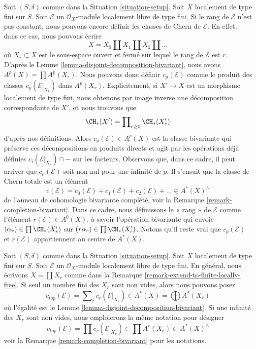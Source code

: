 \begin{remark}
\label{remark-extend-to-finite-locally-free}
Soit $(S, \delta)$ comme dans la Situation \ref{situation-setup}.
Soit $X$ localement de type fini sur $S$.
Soit $\mathcal{E}$ un $\mathcal{O}_X$-module localement libre de type fini.
Si le rang de $\mathcal{E}$ n'est pas constant, nous pouvons
encore définir les classes de Chern de $\mathcal{E}$. En effet, dans ce
cas, nous pouvons écrire
$$
X = X_0 \amalg X_1 \amalg X_2 \amalg \ldots
$$
où $X_r \subset X$ est le sous-espace ouvert et fermé sur lequel
le rang de $\mathcal{E}$ est $r$. D'après le
Lemme \ref{lemma-disjoint-decomposition-bivariant},
nous avons $A^p(X) = \prod A^p(X_r)$.
Nous pouvons donc définir $c_p(\mathcal{E})$ comme le
produit des classes $c_p(\mathcal{E}|_{X_r})$ dans $A^p(X_r)$.
Explicitement, si $X' \to X$ est un morphisme localement de type fini,
nous obtenons par image inverse une décomposition correspondante de $X'$,
et nous trouvons que
$$
\CH_*(X') = \prod\nolimits_{r \geq 0} \CH_*(X'_r)
$$
d'après nos définitions. Alors $c_p(\mathcal{E}) \in A^p(X)$
est la classe bivariante qui préserve ces décompositions
en produits directs et agit par les opérations déjà définies
$c_i(\mathcal{E}|_{X_r}) \cap -$
sur les facteurs. Observons que, dans ce cadre, il peut arriver
que $c_p(\mathcal{E})$ soit non nul pour une infinité de $p$.
Il s'ensuit que la classe de Chern totale est un élément
$$
c(\mathcal{E}) =
c_0(\mathcal{E}) + c_1(\mathcal{E}) + c_2(\mathcal{E}) + \ldots
\in A^*(X)^\wedge
$$
de l'anneau de cohomologie bivariante complété, voir la
Remarque \ref{remark-completion-bivariant}.
Dans ce cadre, nous définissons le « rang » de $\mathcal{E}$
comme l'élément $r(\mathcal{E}) \in A^0(X)$,
à savoir l'opération bivariante qui envoie $(\alpha_r) \in \prod \CH_*(X'_r)$
sur $(r\alpha_r) \in \prod \CH_*(X'_r)$.
Notons qu'il reste vrai que $c_p(\mathcal{E})$ et $r(\mathcal{E})$
appartiennent au centre de $A^*(X)$.
\end{remark}

\begin{remark}
\label{remark-top-chern-class}
Soit $(S, \delta)$ comme dans la Situation \ref{situation-setup}. Soit $X$
localement de type fini sur $S$. Soit $\mathcal{E}$ un
$\mathcal{O}_X$-module localement libre de type fini. En général,
nous écrivons $X = \coprod X_r$ comme dans la
Remarque \ref{remark-extend-to-finite-locally-free}.
Si seul un nombre fini des $X_r$ sont non vides, alors
nous pouvons poser
$$
c_{top}(\mathcal{E}) = \sum\nolimits_r c_r(\mathcal{E}|_{X_r})
\in A^*(X) = \bigoplus A^*(X_r)
$$
où l'égalité est le Lemme \ref{lemma-disjoint-decomposition-bivariant}.
Si une infinité des $X_r$ sont non vides, nous emploierons la même
notation pour désigner
$$
c_{top}(\mathcal{E}) = \prod c_r(\mathcal{E}|_{X_r})
\in \prod A^r(X_r) \subset A^*(X)^\wedge
$$
voir la Remarque \ref{remark-completion-bivariant} pour les notations.
\end{remark}












